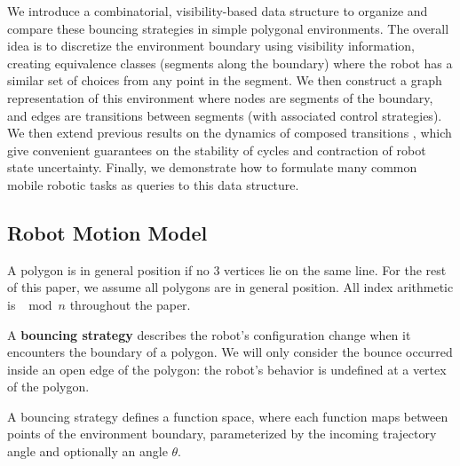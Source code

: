 \documentclass[]{styles/svproc}  %
\begin{document}
We introduce a combinatorial, visibility-based data structure to organize and
compare these bouncing strategies in simple polygonal environments. The overall
idea is to discretize the environment boundary using visibility information,
creating equivalence classes (segments along the boundary) where the robot has a
similar set of choices from any point in the segment. We then construct a graph
representation of this environment where nodes are segments of the boundary, and
edges are transitions between segments (with associated control strategies). We
then extend previous results on the dynamics of composed transitions
\cite{NilBecLav17}, which give convenient guarantees on the stability of cycles
and contraction of robot state uncertainty. Finally, we demonstrate how to
formulate many common mobile robotic tasks as queries to this data structure.


\subsection{Robot Motion Model}\label{subsec:bounce_strategy}

A polygon is in general position if no $3$ vertices lie on the same line. For
the rest of this paper, we assume all polygons are in general position. All
index arithmetic is $\mod n$ throughout the paper.

A \textbf{bouncing strategy} describes the robot's configuration change when it
encounters the boundary of a polygon. We will only consider the bounce occurred
inside an open edge of the polygon: the robot's behavior is undefined at a
vertex of the polygon.

A bouncing strategy defines a function space, where each function maps between 
points of the environment boundary, parameterized by the incoming trajectory
angle and optionally an angle $\theta$.
\end{document}
